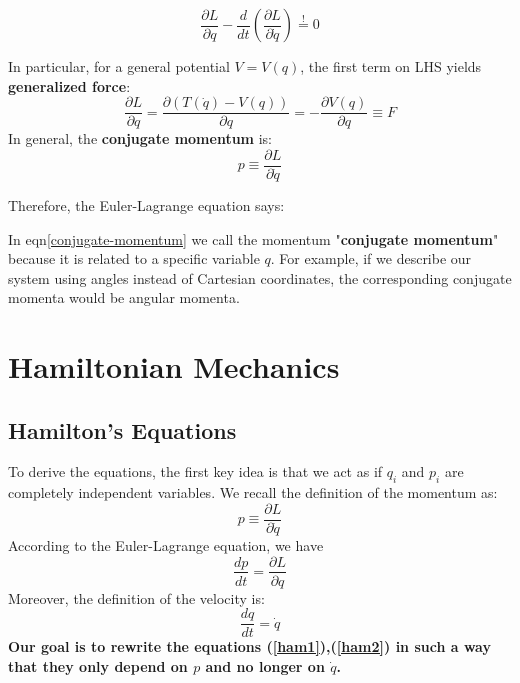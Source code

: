 \begin{qt}
\begin{equation}
\frac{\partial L}{\partial q}-\frac{d}{d t}\left(\frac{\partial L}{\partial \dot{q}}\right) \stackrel{!}{=} 0
\end{equation}
\end{qt}
In particular, for a general potential $V=V(q)$, the first term on LHS yields \textbf{generalized force}:
$$
\frac{\partial L}{\partial q}=\frac{\partial(T(\dot{q})-V(q))}{\partial q}=-\frac{\partial V(q)}{\partial q} \equiv F
$$
In general, the \textbf{conjugate momentum} is:
\begin{equation}
   p \equiv \frac{\partial L}{\partial \dot{q}} 
   \label{conjugate-momentum}
\end{equation}

Therefore, the Euler-Lagrange equation says:
\begin{qt}
\begin{center}
    \textbf{}
\end{center}
\end{qt}


In eqn\ref{conjugate-momentum} we call the momentum "\textbf{conjugate momentum}" because it is related to a specific variable $q$. For example, if we describe our system using angles instead of Cartesian coordinates, the corresponding conjugate momenta would be angular momenta.

\section{Hamiltonian Mechanics}
\subsection{Hamilton's Equations}
To derive the equations, the first key idea is that we act as if $q_{i}$ and $p_{i}$ are completely independent variables. We recall the definition of the momentum as:
\begin{equation}
p \equiv \frac{\partial L}{\partial \dot{q}}
\label{ham0}
\end{equation}
According to the Euler-Lagrange equation, we have
\begin{equation}
\frac{d p}{d t}=\frac{\partial L}{\partial q}
\label{ham1}
\end{equation}
Moreover, the definition of the velocity is:
\begin{equation}
\frac{d q}{d t}=\dot{q}
\label{ham2}
\end{equation}
\textbf{Our goal is to rewrite the equations (\ref{ham1}),(\ref{ham2}) in such a way that they only depend on $p$ and no longer on $\dot{q}$.}

